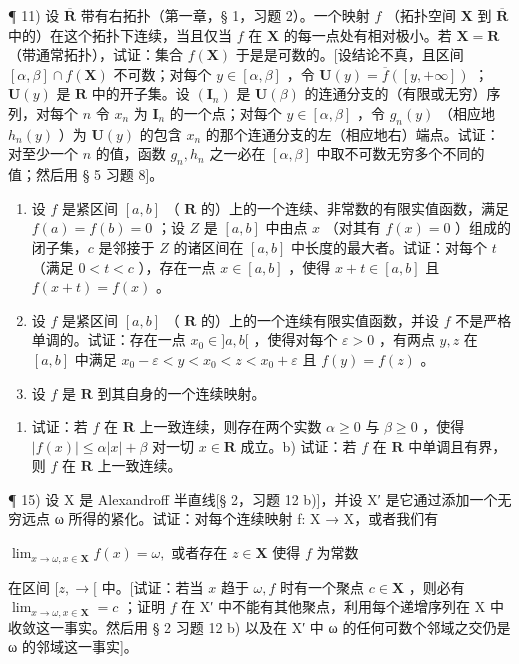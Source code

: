 ¶ 11) 设 \(\overline{\mathbf{R}}\) 带有右拓扑（第一章，§ 1，习题 2）。一个映射 \(f\) （拓扑空间 \(\mathbf{X}\) 到 \(\overline{\mathbf{R}}\) 中的）在这个拓扑下连续，当且仅当 \(f\) 在 \(\mathbf{X}\) 的每一点处有相对极小。若 \(\mathbf{X} = \mathbf{R}\) （带通常拓扑），试证：集合 \(f(\mathbf{X})\) 于是是可数的。{[}设结论不真，且区间 \([\alpha, \beta] \cap f(\mathbf{X})\) 不可数；对每个 \(y \in [\alpha, \beta]\) ，令 \(\mathbf{U}(y) = \overline{f}([y, +\infty])\) ；\(\mathbf{U}(y)\) 是 \(\mathbf{R}\) 中的开子集。设 \((\mathbf{I}_n)\) 是 \(\mathbf{U}(\beta)\) 的连通分支的（有限或无穷）序列，对每个 \(n\) 令 \(x_n\) 为 \(\mathbf{I}_n\) 的一个点；对每个 \(y \in [\alpha, \beta]\) ，令 \(g_n(y)\) （相应地 \(h_n(y) \) ）为 \(\mathbf{U}(y)\) 的包含 \(x_n\) 的那个连通分支的左（相应地右）端点。试证：对至少一个 \(n\) 的值，函数 \(g_n, h_n\) 之一必在 \([\alpha, \beta]\) 中取不可数无穷多个不同的值；然后用 § 5 习题 8{]}。

\begin{enumerate}
\def\labelenumi{\arabic{enumi})}
\setcounter{enumi}{11}
\item
设 \(f\) 是紧区间 \([a, b]\) （ \(\mathbf{R}\) 的）上的一个连续、非常数的有限实值函数，满足 \(f(a) = f(b) = 0\) ；设 \(Z\) 是 \([a, b]\) 中由点 \(x\) （对其有 \(f(x) = 0\) ）组成的闭子集，\(c\) 是邻接于 \(Z\) 的诸区间在 \([a, b]\) 中长度的最大者。试证：对每个 \(t\) （满足 \(0 < t < c\) ），存在一点 \(x \in [a, b]\) ，使得 \(x + t \in [a, b]\) 且 \(f(x + t) = f(x)\) 。
\item
设 \(f\) 是紧区间 \([a, b]\) （ \(\mathbf{R}\) 的）上的一个连续有限实值函数，并设 \(f\) 不是严格单调的。试证：存在一点 \(x_0 \in ]a, b[\) ，使得对每个 \(\varepsilon > 0\) ，有两点 \(y, z\) 在 \([a, b]\) 中满足 \(x_0 - \varepsilon < y < x_0 < z < x_0 + \varepsilon\) 且 \(f(y) = f(z)\) 。
\item
设 \(f\) 是 \(\mathbf{R}\) 到其自身的一个连续映射。
\end{enumerate}

\begin{enumerate}
\def\labelenumi{\alph{enumi})}
\tightlist
\item
试证：若 \(f\) 在 \(\mathbf{R}\) 上一致连续，则存在两个实数 \(\alpha \geqslant 0\) 与 \(\beta \geqslant 0\) ，使得 \(|f(x)| \leqslant \alpha |x| + \beta\) 对一切 \(x \in \mathbf{R}\) 成立。b) 试证：若 \(f\) 在 \(\mathbf{R}\) 中单调且有界，则 \(f\) 在 \(\mathbf{R}\) 上一致连续。
\end{enumerate}

¶ 15) 设 X 是 Alexandroff 半直线{[}§ 2，习题 12 b){]}，并设 X′ 是它通过添加一个无穷远点 ω 所得的紧化。试证：对每个连续映射 f: X → X，或者我们有

\(\lim_{x \to \omega, x \in \mathbf{X}} f(x) = \omega,\) 或者存在 \(z \in \mathbf{X}\) 使得 \(f\) 为常数

在区间 \([z, \rightarrow[\) 中。{[}试证：若当 \(x\) 趋于 \(\omega, f\) 时有一个聚点 \(c \in \mathbf{X}\) ，则必有 \(\lim_{x \to \omega, x \in \mathbf{X}} = c\) ；证明 \(f\) 在 X′ 中不能有其他聚点，利用每个递增序列在 X 中收敛这一事实。然后用 § 2 习题 12 b) 以及在 X′ 中 ω 的任何可数个邻域之交仍是 ω 的邻域这一事实{]}。

